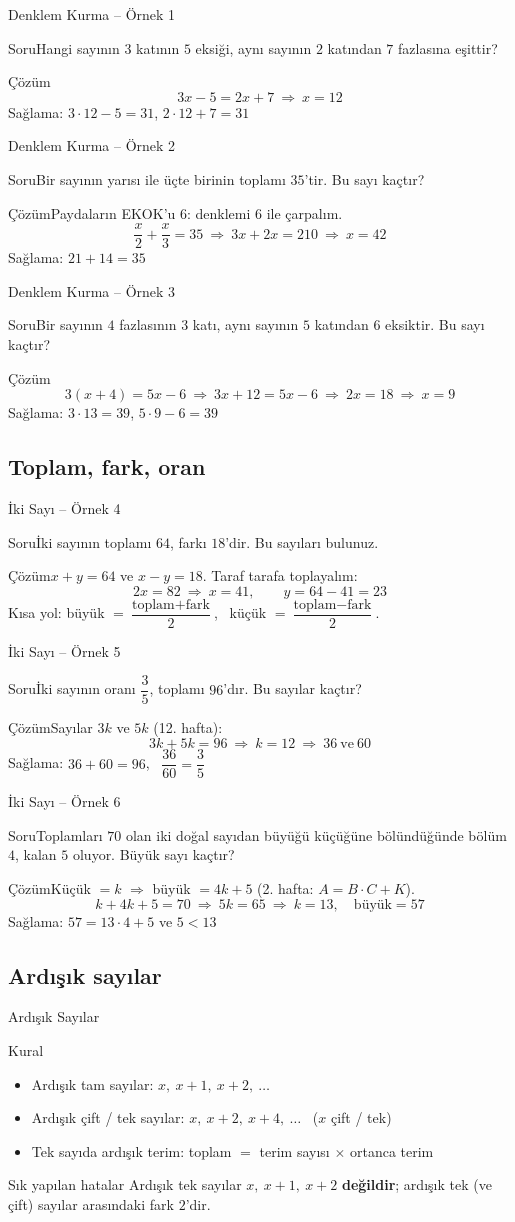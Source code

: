 \documentclass[aspectratio=169,11pt]{beamer}
\newcommand{\soru}[3]{%
\begin{frame}{#1}
  \begin{block}{Soru}\large #2\end{block}
  \pause
  \begin{exampleblock}{Çözüm}\large #3\end{exampleblock}
\end{frame}}
\begin{document}
\soru{Denklem Kurma -- Örnek 1}
{Hangi sayının \(3\) katının \(5\) eksiği, aynı sayının \(2\) katından \(7\) fazlasına eşittir?}
{\[3x-5=2x+7\ \Rightarrow\ x=12\]
Sağlama: \(3\cdot 12-5=31\), \quad \(2\cdot 12+7=31\) \checkmark}

\soru{Denklem Kurma -- Örnek 2}
{Bir sayının yarısı ile üçte birinin toplamı \(35\)'tir. Bu sayı kaçtır?}
{Paydaların EKOK'u \(6\): denklemi \(6\) ile çarpalım.
\[\frac{x}{2}+\frac{x}{3}=35\ \Rightarrow\ 3x+2x=210\ \Rightarrow\ x=42\]
Sağlama: \(21+14=35\) \checkmark}

\soru{Denklem Kurma -- Örnek 3}
{Bir sayının \(4\) fazlasının \(3\) katı, aynı sayının \(5\) katından \(6\) eksiktir. Bu sayı kaçtır?}
{\[3(x+4)=5x-6\ \Rightarrow\ 3x+12=5x-6\ \Rightarrow\ 2x=18\ \Rightarrow\ x=9\]
Sağlama: \(3\cdot 13=39\), \quad \(5\cdot 9-6=39\) \checkmark}

\subsection{Toplam, fark, oran}
\soru{İki Sayı -- Örnek 4}
{İki sayının toplamı \(64\), farkı \(18\)'dir. Bu sayıları bulunuz.}
{\(x+y=64\) ve \(x-y=18\). Taraf tarafa toplayalım:
\[2x=82\ \Rightarrow\ x=41,\qquad y=64-41=23\]
Kısa yol: büyük \(=\dfrac{\text{toplam}+\text{fark}}{2}\), \ küçük \(=\dfrac{\text{toplam}-\text{fark}}{2}\).}

\soru{İki Sayı -- Örnek 5}
{İki sayının oranı \(\dfrac{3}{5}\), toplamı \(96\)'dır. Bu sayılar kaçtır?}
{Sayılar \(3k\) ve \(5k\) (12. hafta):
\[3k+5k=96\ \Rightarrow\ k=12\ \Rightarrow\ 36\ \text{ve}\ 60\]
Sağlama: \(36+60=96\), \ \(\dfrac{36}{60}=\dfrac{3}{5}\) \checkmark}

\soru{İki Sayı -- Örnek 6}
{Toplamları \(70\) olan iki doğal sayıdan büyüğü küçüğüne bölündüğünde bölüm \(4\), kalan \(5\) oluyor. Büyük sayı kaçtır?}
{Küçük \(=k\) \(\Rightarrow\) büyük \(=4k+5\) (2. hafta: \(A=B\cdot C+K\)).
\[k+4k+5=70\ \Rightarrow\ 5k=65\ \Rightarrow\ k=13,\quad \text{büyük}=57\]
Sağlama: \(57=13\cdot 4+5\) ve \(5<13\) \checkmark}

\subsection{Ardışık sayılar}
\begin{frame}{Ardışık Sayılar}
\begin{block}{Kural}
\begin{itemize}
\item Ardışık tam sayılar: \(x,\ x+1,\ x+2,\ \dots\)
\item Ardışık çift / tek sayılar: \(x,\ x+2,\ x+4,\ \dots\) \ (\(x\) çift / tek)
\item Tek sayıda ardışık terim: toplam \(=\) terim sayısı \(\times\) ortanca terim
\end{itemize}
\end{block}
\begin{alertblock}{Sık yapılan hatalar}
Ardışık tek sayılar \(x,\ x+1,\ x+2\) \textbf{değildir}; ardışık tek (ve çift) sayılar arasındaki fark \(2\)'dir.
\end{alertblock}
\end{frame}
\end{document}
